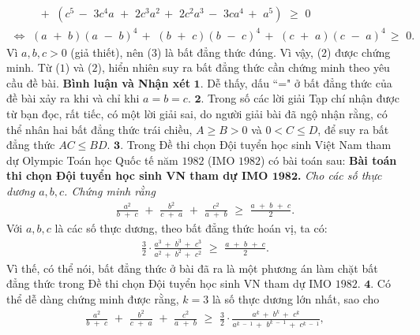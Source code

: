 \begin{multicols}{2}
{\begin{align*}
			\,\,\,\,\,\,\,\,\,\,\,\,\,\,\, + \,\,\left( {{c^5}\, - \,\,3{c^4}a\,\, + \,\,2{c^3}{a^2}\, + \,\,2{c^2}{a^3}\, - \,\,3c{a^4}\, + \,\,{a^5}} \right)\,\, \ge \,\,0\\
			\Leftrightarrow \,\,\left( {a\,\, + \,\,b} \right){\left( {a\,\, - \,\,b} \right)^4}\, + \,\,\left( {b\,\, + \,\,c} \right){\left( {b\,\, - \,\,c} \right)^4}\, + \,\,\left( {c\,\, + \,\,a} \right){\left( {c\,\, - \,\,a} \right)^4}\, \ge \,\,0. \tag{$3$}
	\end{align*}
	Vì $a, b, c > 0$ (giả thiết), nên ($3$) là bất đẳng thức đúng. Vì vậy, ($2$) được chứng minh.
	\vskip 0.05cm
	Từ ($1$) và ($2$), hiển nhiên suy ra bất đẳng thức cần chứng minh theo yêu cầu đề bài.
	\vskip 0.05cm
	\textbf{Bình luận và Nhận xét}
	\vskip 0.05cm
	$\pmb{1.}$ Dễ thấy, dấu ``=" ở bất đẳng thức của đề bài xảy ra khi và chỉ khi $a = b = c.$
	\vskip 0.05cm
	$\pmb{2.}$ Trong số các lời giải Tạp chí nhận được từ bạn đọc, rất tiếc, có một lời giải sai, do người giải bài đã ngộ nhận rằng, có thể nhân hai bất đẳng thức trái chiều, $A \ge B > 0$ và $0 < C \le D$, để suy ra bất đẳng thức $AC \le BD$.
	\vskip 0.05cm
	$\pmb{3.}$ Trong Đề thi chọn Đội tuyển học sinh Việt Nam tham dự Olympic Toán học Quốc tế năm $1982$ (IMO $1982$) có bài toán sau:
	\vskip 0.05cm
	\textbf{Bài toán thi chọn Đội tuyển học sinh VN tham dự IMO $\pmb{1982}$.} \textit{Cho các số thực dương $a, b, c$. Chứng minh rằng}
	\begin{align*}
		\frac{{{a^2}}}{{b\,\, + \,\,c}}\,\, + \,\,\frac{{{b^2}}}{{c\,\, + \,\,a}}\,\, + \,\,\frac{{{c^2}}}{{a\,\, + \,\,b}}\,\, \ge \,\,\frac{{a\,\, + \,\,b\,\, + \,\,c}}{2}.
	\end{align*}
	Với $a, b, c$ là các số thực dương, theo bất đẳng thức hoán vị, ta có:
	\begin{align*}
		\frac{3}{2} \cdot \frac{{{a^3}\, + \,\,{b^3}\, + \,\,{c^3}}}{{{a^2}\, + \,\,{b^2}\, + \,\,{c^2}}}\,\, \ge \,\,\frac{{a\,\, + \,\,b\,\, + \,\,c}}{2}.
	\end{align*}
	Vì thế, có thể nói, bất đẳng thức ở bài đã ra là một phương án làm chặt bất đẳng thức trong Đề thi chọn Đội tuyển học sinh VN tham dự IMO $1982$.
	\vskip 0.05cm
	$\pmb{4.}$ Có thể dễ dàng chứng minh được rằng, $k = 3$ là số thực dương lớn nhất, sao cho
	\begin{align*}
		\frac{{{a^2}}}{{b\,\, + \,\,c}}\,\, + \,\,\frac{{{b^2}}}{{c\,\, + \,\,a}}\,\, + \,\,\frac{{{c^2}}}{{a\,\, + \,\,b}}\,\, \ge \,\,\frac{3}{2} \cdot \frac{{{a^k}\, + \,\,{b^k}\, + \,\,{c^k}}}{{{a^{k\,\, - \,\,1}}\, + \,\,{b^{k\,\, - \,\,1}}\, + \,\,{c^{k\,\, - \,\,1}}}},

\end{align*}}
\end{multicols}
